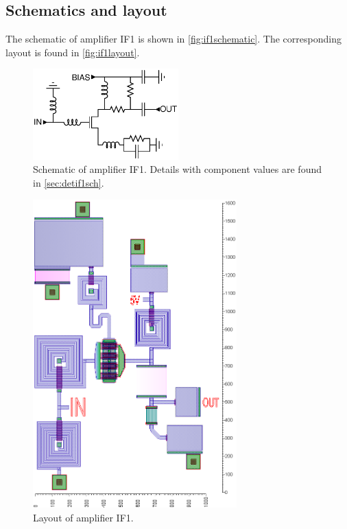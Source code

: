 		\subsection{Schematics and layout}
			The schematic of amplifier IF1 is shown in \autoref{fig:if1schematic}. The corresponding layout is found in \autoref{fig:if1layout}.
			
			\begin{figure}[hbt!]
				\centering
				\includegraphics[width=0.5\textwidth]{fig/amplifiers/if1/sch_if1}
				\caption[Amplifier IF1 schematic.]{Schematic of amplifier IF1. Details with component values are found in \autoref{sec:detif1sch}.}\label{fig:if1schematic}
			\end{figure}

			\begin{figure}[hbt!]
				\centering
				\includegraphics[width=0.7\textwidth]{fig/amplifiers/if1/layout}
				\caption[Amplifier IF1 layout.]{Layout of amplifier IF1.\scalemum}\label{fig:if1layout}
			\end{figure}

